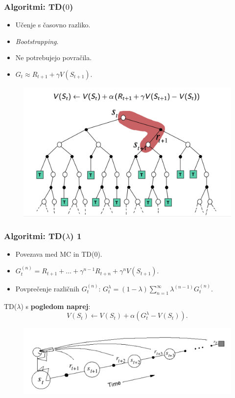 \documentclass{beamer}    %
\begin{document}
\begin{frame}
    \frametitle{Algoritmi: TD($0$)}
    \begin{itemize}
        \item Učenje s časovno razliko.
        \item \textit{Bootstrapping}. 
        \item Ne potrebujejo povračila.
        \item $G_t \approx R_{t+1} + \gamma V(S_{t+1})$.
    \end{itemize}

    \begin{figure}[b]
        \includegraphics[scale=0.45]{slike/backup-td.png}
    \end{figure}
\end{frame}


\begin{frame}
    \frametitle{Algoritmi: TD($\lambda$) 1}
    \begin{itemize}
        \item Povezava med MC in TD($0$).
        \item $G_t^{(n)} = R_{t+1} + \dots + \gamma^{n-1} R_{t+n} + \gamma^n V(S_{t+1}).$
        \item Povprečenje različnih $G_t^{(n)}$: $G_t^\lambda = (1 - \lambda) \sum_{n=1}^\infty 
                                                 \lambda^{(n-1)} G_t^{(n)}.$
    \end{itemize}

    \medskip
    \medskip
    \medskip
    TD($\lambda$) s \textbf{pogledom naprej}: 
    $$
    V(S_t) \leftarrow V(S_t) + \alpha (G_t^\lambda - V(S_t)).
    $$
    \begin{figure}[b]
        \includegraphics[scale=0.45]{slike/pogled-naprej.png}
    \end{figure}
\end{frame}
\end{document}

